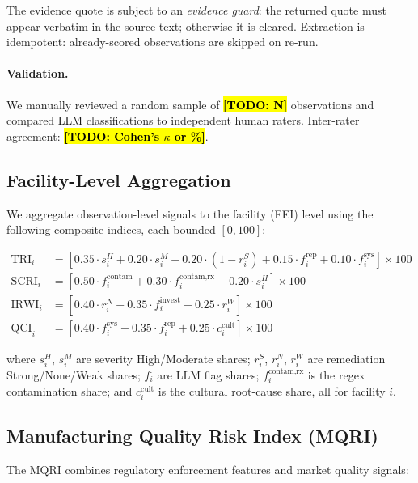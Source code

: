 \documentclass[12pt]{article}
\newcommand{\todo}[1]{\hl{\textbf{[TODO: #1]}}}
\begin{document}
The evidence quote is subject to an \emph{evidence guard}: the returned quote
must appear verbatim in the source text; otherwise it is cleared.
Extraction is idempotent: already-scored observations are skipped on re-run.

\paragraph{Validation.}
We manually reviewed a random sample of \todo{N} observations and compared
LLM classifications to independent human raters.
Inter-rater agreement: \todo{Cohen's $\kappa$ or \%}.

\subsection{Facility-Level Aggregation}

We aggregate observation-level signals to the facility (FEI) level using
the following composite indices, each bounded $[0, 100]$:

\begin{align}
\text{TRI}_i &= \left[
    0.35 \cdot s^H_i
  + 0.20 \cdot s^M_i
  + 0.20 \cdot (1 - r^S_i)
  + 0.15 \cdot f^{\text{rep}}_i
  + 0.10 \cdot f^{\text{sys}}_i
\right] \times 100 \label{eq:tri} \\
\text{SCRI}_i &= \left[
    0.50 \cdot f^{\text{contam}}_i
  + 0.30 \cdot f^{\text{contam,rx}}_i
  + 0.20 \cdot s^H_i
\right] \times 100 \label{eq:scri} \\
\text{IRWI}_i &= \left[
    0.40 \cdot r^N_i
  + 0.35 \cdot f^{\text{invest}}_i
  + 0.25 \cdot r^W_i
\right] \times 100 \label{eq:irwi} \\
\text{QCI}_i &= \left[
    0.40 \cdot f^{\text{sys}}_i
  + 0.35 \cdot f^{\text{rep}}_i
  + 0.25 \cdot c^{\text{cult}}_i
\right] \times 100 \label{eq:qci}
\end{align}

where $s^H_i$, $s^M_i$ are severity High/Moderate shares; $r^S_i$, $r^N_i$,
$r^W_i$ are remediation Strong/None/Weak shares; $f^{\cdot}_i$ are LLM flag
shares; $f^{\text{contam,rx}}_i$ is the regex contamination share; and
$c^{\text{cult}}_i$ is the cultural root-cause share, all for facility $i$.

\subsection{Manufacturing Quality Risk Index (MQRI)}

The MQRI combines regulatory enforcement features and market quality signals:
\end{document}
